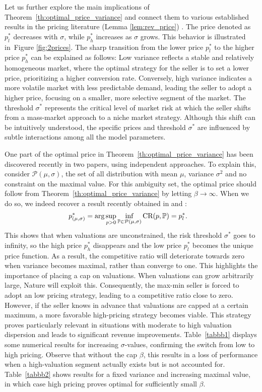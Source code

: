 \documentclass[11pt]{article}
\newcommand{\bP}{\mathbb{P}}
\newcommand{\cP}{\mathcal{P}}
\newcommand{\1}{\mathds{1}}
\begin{document}
Let us further explore the main implications of Theorem~\ref{th:optimal_price_variance} and connect them to various established results in the pricing literature (Lemma  \ref{lem:rev_price})  . The  price denoted as $p^*_l$ decreases with $\sigma$, while $p^*_h$ increases as $\sigma$ grows. This behavior is illustrated in~Figure \ref{fig:2prices}. The sharp transition from the lower price $p^*_l$ to the higher price $p^*_h$ can be explained as follows: Low variance reflects a stable and relatively homogeneous market, where the optimal strategy for the seller is to set a lower price, prioritizing a higher conversion rate. Conversely, high variance indicates a more volatile market with less predictable demand, leading the seller to adopt a higher price, focusing on a smaller, more selective segment of the market. The threshold $\sigma^*$ represents the critical level of market risk at which the seller shifts from a mass-market approach to a niche market strategy. Although this shift can be intuitively understood, the specific prices and threshold $\sigma^*$ are influenced by subtle interactions among all the model parameters.

One part of the optimal price in Theorem~\ref{th:optimal_price_variance} has been discovered recently in two papers, using independent approaches. To explain this, consider 
$\cP(\mu,\sigma)$, the set of all distribution with mean $\mu$, variance $\sigma^2$ and no constraint on the maximal value. For this ambiguity set, the optimal price should follow from Theorem~\ref{th:optimal_price_variance} by letting $\beta\to\infty$. When we do so, we indeed recover a result recently obtained in 
\cite{giannakopoulos2019robust} and \cite{chen2022distribution}: 
\begin{align}
p_{(\mu,\sigma)}^* &= \arg\sup_{p>0}\inf_{\bP\in\cP(\mu,\sigma)}\textup{CR}(p,\bP)=p^*_l.
\end{align}
This shows that when valuations are unconstrained, the risk threshold $\sigma^*$ goes to infinity, so the high price  $p^*_h$ disappears and the low price $p^*_l$ becomes the unique price function. As a result, the competitive ratio will deteriorate towards zero when variance becomes maximal, rather than converge to one. This highlights the importance of placing a cap on valuations. When valuations can grow arbitrarily large, Nature will exploit this. Consequently, the max-min seller is forced to adopt an low pricing strategy, leading to a competitive ratio close to zero. However, if the seller knows in advance that valuations are capped at a certain maximum, a more favorable high-pricing strategy becomes viable. This strategy proves particularly relevant in situations with moderate to high valuation dispersion and leads to significant revenue improvements. Table~\ref{tabbb1} displays some numerical results for increasing $\sigma$-values, confirming the switch from low to high pricing. Observe that without the cap $\beta$, this results in a loss of performance when a high-valuation segment actually exists but is not accounted for. Table~\ref{tabbb2} shows results for a fixed variance and increasing maximal value, in which case high pricing proves optimal for sufficiently small $\beta$.
\end{document}

